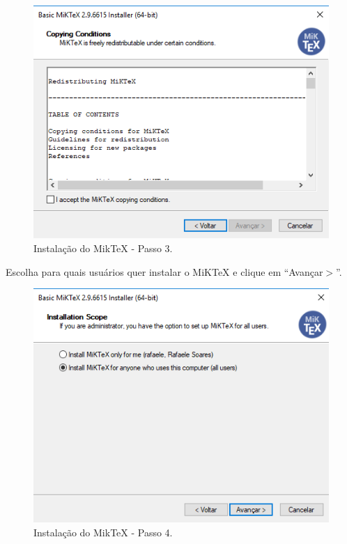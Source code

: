 \begin{figure}[htb]
  \begin{center}
    \includegraphics[scale=0.7]{imagens/miktex/miktex3.png}
  \end{center}
  \caption{Instalação do MikTeX - Passo 3.}
  \label{mt3}
\end{figure}

Escolha para quais usuários quer instalar o MiKTeX e clique em “Avançar$>$”.\\

\begin{figure}[htb]
  \begin{center}
    \includegraphics[scale=0.7]{imagens/miktex/miktex4.png}
  \end{center}
  \caption{Instalação do MikTeX - Passo 4.}
  \label{mt4}
\end{figure}

